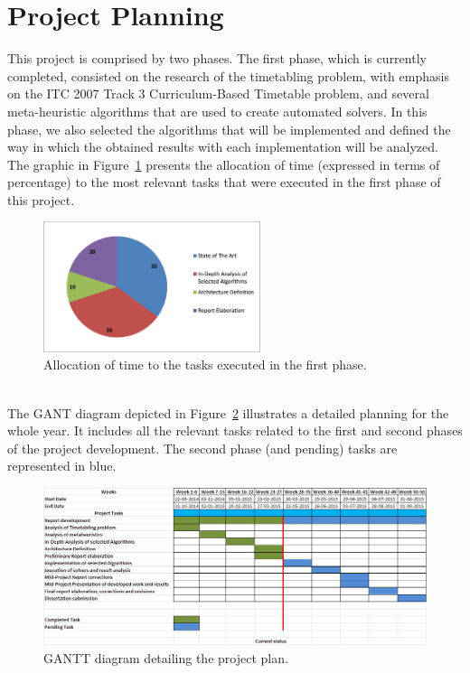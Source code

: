 \section{Project Planning}
\label{planning}
\thispagestyle{plain}
This project is comprised by two phases. The first phase, which is currently completed, consisted on the research of the timetabling problem, with emphasis on the ITC 2007 Track 3 Curriculum-Based Timetable problem, and several meta-heuristic algorithms that are used to create automated solvers. In this phase, we also selected the algorithms that will be implemented and defined the way in which the obtained results with each implementation will be analyzed.\\
The graphic in Figure~\ref{fig:completedTasks} presents the allocation of time (expressed in terms of percentage) to the most relevant tasks that were executed in the first phase of this project.\\
\begin{figure}[h!]
 \centering
   \includegraphics[width=6.36cm]{./images/figures/Fig5_CompletedProjectTasks.png}
   \caption{Allocation of time to the tasks executed in the first phase.}
   \label{fig:completedTasks}
\end{figure}\\
The GANT diagram depicted in Figure~\ref{fig:ganttDiagram} illustrates a detailed planning for the whole year. It includes all the relevant tasks related to the first and second phases of the project development. The second phase (and pending) tasks are represented in blue.\\
\begin{figure}[h!]
 \centering
   \hspace*{-2cm}
   \includegraphics[width=20cm]{./images/figures/Fig6_GANTT_Diagram.png}
   \caption{GANTT diagram detailing the project plan.}
   \label{fig:ganttDiagram}
\end{figure}\\
